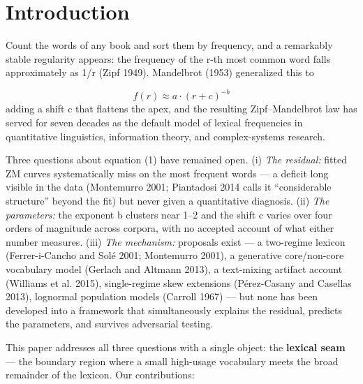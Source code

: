 \documentclass[11pt]{article}
\begin{document}
\section{Introduction}
Count the words of any book and sort them by frequency, and a remarkably stable regularity appears: the frequency of the r-th most common word falls approximately as 1/r (Zipf 1949). Mandelbrot (1953) generalized this to

\begin{equation}f(r) \approx  a \cdot  (r + c)^{-b}\end{equation}
adding a shift c that flattens the apex, and the resulting Zipf--Mandelbrot law has served for seven decades as the default model of lexical frequencies in quantitative linguistics, information theory, and complex-systems research.

Three questions about equation (1) have remained open. (i) \emph{The residual:} fitted ZM curves systematically miss on the most frequent words --- a deficit long visible in the data (Montemurro 2001; Piantadosi 2014 calls it ``considerable structure'' beyond the fit) but never given a quantitative diagnosis. (ii) \emph{The parameters:} the exponent b clusters near 1--2 and the shift c varies over four orders of magnitude across corpora, with no accepted account of what either number measures. (iii) \emph{The mechanism:} proposals exist --- a two-regime lexicon (Ferrer-i-Cancho and Solé 2001; Montemurro 2001), a generative core/non-core vocabulary model (Gerlach and Altmann 2013), a text-mixing artifact account (Williams et al. 2015), single-regime skew extensions (Pérez-Casany and Casellas 2013), lognormal population models (Carroll 1967) --- but none has been developed into a framework that simultaneously explains the residual, predicts the parameters, and survives adversarial testing.

This paper addresses all three questions with a single object: the \textbf{lexical seam} --- the boundary region where a small high-usage vocabulary meets the broad remainder of the lexicon. Our contributions:
\end{document}

